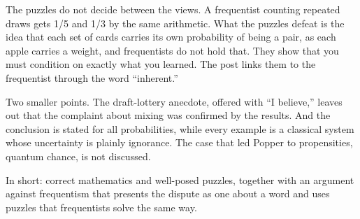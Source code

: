 \begin{afterword}
The puzzles do not decide between the views. A frequentist counting repeated draws gets 1/5 and 1/3 by the same arithmetic. What the puzzles defeat is the idea that each set of cards carries its own probability of being a pair, as each apple carries a weight, and frequentists do not hold that. They show that you must condition on exactly what you learned. The post links them to the frequentist through the word ``inherent.''

Two smaller points. The draft-lottery anecdote, offered with ``I believe,'' leaves out that the complaint about mixing was confirmed by the results. And the conclusion is stated for all probabilities, while every example is a classical system whose uncertainty is plainly ignorance. The case that led Popper to propensities, quantum chance, is not discussed.

In short: correct mathematics and well-posed puzzles, together with an argument against frequentism that presents the dispute as one about a word and uses puzzles that frequentists solve the same way.
\end{afterword}
